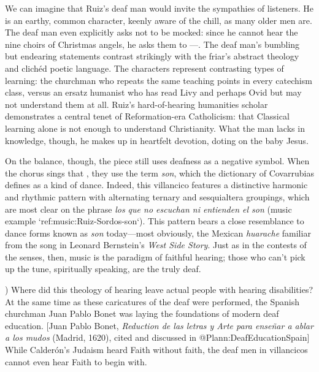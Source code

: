 We can imagine that Ruiz's deaf man would invite the sympathies of listeners.
He is an earthy, common character, keenly aware of the chill, as many older men are.
The deaf man even explicitly asks not to be mocked: since he cannot hear the nine choirs of Christmas angels, he asks them to ---.
The deaf man's bumbling but endearing statements contrast strikingly with the friar's abstract theology and clichéd poetic language.
The characters represent contrasting types of learning: the churchman who repeats the same teaching points in every catechism class, versus an ersatz humanist who has read Livy and perhaps Ovid but may not understand them at all.
Ruiz's hard-of-hearing humanities scholar demonstrates a central tenet of Reformation-era Catholicism: that Classical learning alone is not enough to understand Christianity.
\Autocite[206: .]{Erasmus:Dolan}
What the man lacks in knowledge, though, he makes up in heartfelt devotion, doting on the baby Jesus.

On the balance, though, the piece still uses deafness as a negative symbol.
When the chorus sings that , they use the term \emph{son}, which the dictionary of Covarrubias defines as a kind of dance.
Indeed, this villancico features a distinctive harmonic and rhythmic pattern with alternating ternary and sesquialtera groupings, which are most clear on the phrase \emph{los que no escuchan ni entienden el son} (music example `ref:music:Ruiz-Sordos-son`).
This pattern bears a close resemblance to dance forms known as \emph{son} today---most obviously, the Mexican \emph{huarache} familiar from the song  in Leonard Bernstein's \emph{West Side Story}.
\Autocite[; @Wells:WestSideStory]{Grove}
Just as in the contests of the senses, then, music is the paradigm of faithful hearing; those who can't pick up the tune, spiritually speaking, are the truly deaf.


\label{music:Ruiz-Sordos-son})
Where did this theology of hearing leave actual people with hearing disabilities? At the same time as these caricatures of the deaf were performed, the Spanish churchman Juan Pablo Bonet was laying the foundations of modern deaf education.
[Juan Pablo Bonet, \emph{Reduction de las letras y Arte para enseñar a ablar a los mudos} (Madrid, 1620), cited and discussed in @Plann:DeafEducationSpain]  %
While Calderón's Judaism heard Faith without faith, the deaf men in villancicos cannot even hear Faith to begin with.

